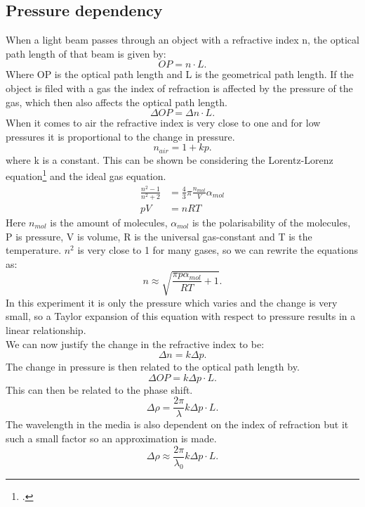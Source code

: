 \documentclass[working, oneside]{inputs/tuftebook}
\begin{document}
\subsection*{Pressure dependency}
When a light beam passes through an object with a refractive index n, the optical path length of that beam is given by:
\[
OP=n \cdot L
.\] 
Where OP is the optical path length and L is the geometrical path length. If the object is filed with a gas the index of refraction is affected by the pressure of the gas, which then also affects the optical path length. 
\[
\Delta OP = \Delta n \cdot L
.\] 
When it comes to air the refractive index is very close to one and for low pressures it is proportional to the change in pressure.
\[
n_{air} = 1 + k p
.\] 
where k is a constant. 
This can be shown be considering the Lorentz-Lorenz equation\footcite{https://www.oxfordreference.com/view/10.1093/oi/authority.20110803100115114} and the ideal gas equation.
\begin{align*}
\frac{n^2-1}{n^2+2} &=\frac{4}{3}\pi \frac{n_{mol}}{V}\alpha_{mol}
\\
pV &= nRT
\end{align*}
Here $n_{mol}$ is the amount of molecules, $\alpha_{mol}$ is the polarisability of the molecules, P is pressure, V is volume, R is the universal gas-constant and T is the temperature.
$n^2$ is very close to 1 for many gases, so we can rewrite the equations as:
\[
n \approx \sqrt{\frac{\pi p\alpha_{mol}}{RT}+1}
.\] 
In this experiment it is only the pressure which varies and the change is very small, so a Taylor expansion of this equation with respect to pressure results in a linear relationship. \\
We can now justify the change in the refractive index to be:
\[
\Delta n =k\Delta p
.\] 
The change in pressure is then related to the optical path length by.
\[
\Delta OP = k\Delta p\cdot L
.\] 
This can then be related to the phase shift.
\[
\Delta \rho = \frac{2\pi}{\lambda}k\Delta p\cdot L
.\] 
The wavelength in the media is also dependent on the index of refraction but it such a small factor so an approximation is made.
\[
\Delta \rho \approx \frac{2\pi}{\lambda_0}k\Delta p\cdot L
.\] 
\end{document}
